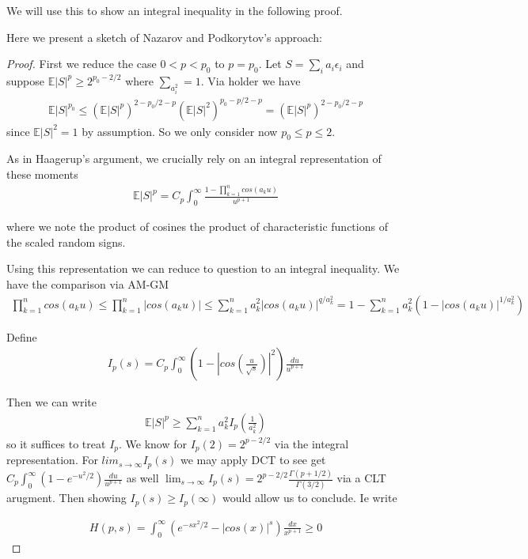 \documentclass[10pt]{article}
\newcommand{\E}{\mathbb{E}}
\newcommand{\1}{\textbf{1}}
\theoremstyle{remark}
\theoremstyle{definition}
\begin{document}

We will use this to show an integral inequality in the following proof.

Here we present a sketch of Nazarov and Podkorytov's approach:

\begin{proof}
	First we reduce the case $0 < p < p_0$ to $p = p_0$. Let $S = \sum_i a_i \epsilon_i$ and suppose $\E|S|^p \geq 2^{p_0 - 2/2}$ where $\sum_ a_i^2 = 1$. Via holder we have
	\begin{align*}
		\E|S|^{p_0} \leq (\E|S|^p)^{2-p_0/2-p}(\E|S|^2)^{p_0-p/2-p} = (\E|S|^p)^{2-p_0/2-p}
	\end{align*} 
	since $\E|S|^2 = 1$ by assumption. So we only consider now $p_0 \leq p \leq 2$. 

	As in Haagerup's argument, we crucially rely on an integral representation of these moments
	\begin{align*}
		\E|S|^p = C_p\int_0^{\infty}\frac{1-\prod_{k=1}^n cos(a_k u)}{u^{p+1}}
	\end{align*}

	where we note the product of cosines the product of characteristic functions of the scaled random signs.

	Using this representation we can reduce to question to an integral inequality. We have the comparison via AM-GM
	\begin{align*}
		\prod_{k=1}^n cos(a_k u) \leq \prod_{k=1}^n |cos(a_k u)| \leq \sum_{k=1}^n a_k^2|cos(a_k u)|^{q/a_k^2} = 1 - \sum_{k=1}^na_k^2(1- |cos(a_k u)|^{1/a_k^2})
	\end{align*}

	Define 
	\begin{align*}
		I_p(s) = C_p\int_0^{\infty}(1-|cos(\frac{u}{\sqrt{s}})|^2)\frac{du}{u^{p+1}}
	\end{align*}

	Then we can write
	\begin{align*}
		\E|S|^p \geq \sum_{k=1}^na_k^2 I_p(\frac{1}{a_k^2})
	\end{align*}
	so it suffices to treat $I_p$. We know for $I_p(2) = 2^{p-2/2}$ via the integral representation. For $lim_{s \to \infty}I_p(s)$ we may apply DCT to see get $C_p \int_0^{\infty}(1-e^{-u^2/2})\frac{du}{u^{p+1}}$ as well $\lim_{s \to \infty}I_p(s) = 2^{p-2/2}\frac{\Gamma(p+1/2)}{\Gamma(3/2)}$ via a CLT arugment. Then showing $I_p(s) \geq I_p(\infty)$ would allow us to conclude. Ie write

	\begin{align*}
		H(p,s) = \int_0^{\infty}(e^{-sx^2/2} - |cos(x)|^s)\frac{dx}{x^{p+1}} \geq 0 
	\end{align*}


\end{proof}
\end{document}
